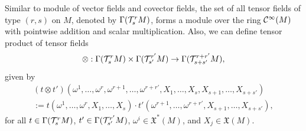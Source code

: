 Similar to module of vector fields and covector fields, the set of all tensor fields of type \((r, s)\) on \(M\), denoted by \(\Gamma(\mathcal T^r_s M)\), forms a module over the ring \(\mathcal C^\infty(M)\) with pointwise addition and scalar multiplication. Also, we can define tensor product of tensor fields
\begin{equation}
	\otimes: \Gamma(\mathcal T^r_s M) \times \Gamma(\mathcal T^{r'}_{s'} M) \to \Gamma(\mathcal T^{r + r'}_{s + s'} M),
\end{equation}
given by
\begin{multline}
	(t \otimes t')( \omega^1, \ldots, \omega^r, \omega^{r+1}, \ldots, \omega^{r + r'}, X_1, \ldots, X_s, X_{s+1}, \ldots, X_{s + s'}) \\
	:= t(\omega^1, \ldots, \omega^r, X_1, \ldots, X_s) \cdot t'(\omega^{r+1}, \ldots, \omega^{r + r'}, X_{s+1}, \ldots, X_{s + s'}),
\end{multline}
for all \(t \in \Gamma(\mathcal T^r_s M)\), \(t' \in \Gamma(\mathcal T^{r'}_{s'} M)\), \(\omega^i \in \mathfrak{X}^*(M)\), and \(X_j \in \mathfrak{X}(M)\).
